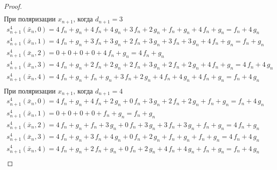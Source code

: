 \documentclass[bibliography=totoc, a4paper, 14pt]{extarticle}
\begin{document}
\begin{proof}
$$\begin{array}{l}
\end{array}$$
При поляризации $x_{n+1}$, когда $d_{n+1} = 3$
$$\begin{array}{l}
s_{n+1}^4(\bar{x}_n, 0) = 4\,f_n + g_n + 4\,f_n + 4\,g_n + 3\,f_n + 2\,g_n + f_n + g_n + 4\,f_n + g_n = f_n + 4\,g_n \\
s_{n+1}^4(\bar{x}_n, 1) = 4\,f_n + g_n + 3\,f_n + 3\,g_n + 2\,f_n + 3\,g_n + 3\,f_n + 3\,g_n + 4\,f_n + g_n = f_n + g_n \\
s_{n+1}^4(\bar{x}_n, 2) = 0 + 0 + 0 + 0 + 4\,f_n + g_n = 4\,f_n + g_n \\
s_{n+1}^4(\bar{x}_n, 3) = 4\,f_n + g_n + 2\,f_n + 2\,g_n + 2\,f_n + 3\,g_n + 2\,f_n + 2\,g_n + 4\,f_n + g_n = 4\,f_n + 4\,g_n \\
s_{n+1}^4(\bar{x}_n, 4) = 4\,f_n + g_n + f_n + g_n + 3\,f_n + 2\,g_n + 4\,f_n + 4\,g_n + 4\,f_n + g_n = f_n + 4\,g_n \\
\end{array}$$
При поляризации $x_{n+1}$, когда $d_{n+1} = 4$
$$\begin{array}{l}
s_{n+1}^4(\bar{x}_n, 0) = 4\,f_n + g_n + 4\,f_n + 2\,g_n + 0\,f_n + 3\,g_n + 2\,f_n + 2\,g_n + f_n + g_n = f_n + 4\,g_n \\
s_{n+1}^4(\bar{x}_n, 1) = 0 + 0 + 0 + 0 + f_n + g_n = f_n + g_n \\
s_{n+1}^4(\bar{x}_n, 2) = 4\,f_n + g_n + f_n + 3\,g_n + 0\,f_n + 3\,g_n + 3\,f_n + 3\,g_n + f_n + g_n = 4\,f_n + g_n \\
s_{n+1}^4(\bar{x}_n, 3) = 4\,f_n + g_n + 3\,f_n + 4\,g_n + 0\,f_n + 2\,g_n + f_n + g_n + f_n + g_n = 4\,f_n + 4\,g_n \\
s_{n+1}^4(\bar{x}_n, 4) = 4\,f_n + g_n + 2\,f_n + g_n + 0\,f_n + 2\,g_n + 4\,f_n + 4\,g_n + f_n + g_n = f_n + 4\,g_n \\
\end{array}$$

\end{proof}
\end{document}
